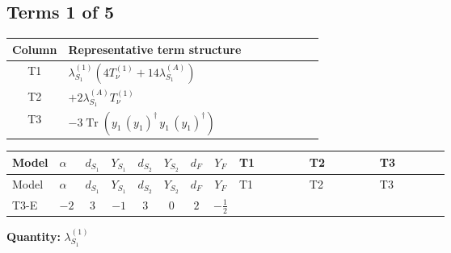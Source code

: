 \documentclass[8pt]{article}
\begin{document}
\begin{landscape}
\subsection*{Terms 1 of 5}
\begin{center}
\begin{tabular}{@{}c >{\raggedright\arraybackslash}p{0.82\linewidth}@{}}
\toprule
Column & Representative term structure \\
\midrule
T1 & \(\displaystyle {\lambda_{S_1}^{(1)}} (4 T_{\nu}^{(1)}+14 {\lambda_{S_1}^{(A)}})\) \\
\midrule
T2 & \(\displaystyle +2 {\lambda_{S_1}^{(A)}} T_{\nu}^{(1)}\) \\
\midrule
T3 & \(\displaystyle -3 \operatorname{Tr}\!\left({y_1}\,\left({y_1}\right)^{\dagger}\,{y_1}\,\left({y_1}\right)^{\dagger}\right)\) \\
\midrule
\bottomrule
\end{tabular}
\end{center}
\smallskip
\tiny
\begin{longtable}{@{}llcccccc >{\raggedright\arraybackslash}p{0.21\linewidth} >{\raggedright\arraybackslash}p{0.21\linewidth} >{\raggedright\arraybackslash}p{0.21\linewidth}@{}}
\toprule
Model & $\alpha$ & $d_{S_1}$ & $Y_{S_1}$ & $d_{S_2}$ & $Y_{S_2}$ & $d_F$ & $Y_F$ & T1 & T2 & T3 \\
\midrule
\endfirsthead
\toprule
Model & $\alpha$ & $d_{S_1}$ & $Y_{S_1}$ & $d_{S_2}$ & $Y_{S_2}$ & $d_F$ & $Y_F$ & T1 & T2 & T3 \\
\midrule
\endhead
T3-E & $-2$ & $3$ & $-1$ & $3$ & $0$ & $2$ & $-\frac{1}{2}$ & \scriptsize\adjustbox{max width=\linewidth}{$\begin{gathered} {\lambda_{S_1}^{(1)}} (4 T_{\nu}^{(1)}+14 {\lambda_{S_1}^{(A)}})\end{gathered}$} & \scriptsize\adjustbox{max width=\linewidth}{$\begin{gathered} +2 {\lambda_{S_1}^{(A)}} T_{\nu}^{(1)}\end{gathered}$} & \scriptsize\adjustbox{max width=\linewidth}{$\begin{gathered} -3 \operatorname{Tr}\!\left({y_1}\,\left({y_1}\right)^{\dagger}\,{y_1}\,\left({y_1}\right)^{\dagger}\right)\end{gathered}$} \\
\midrule
\bottomrule
\end{longtable}
\clearpage
\noindent\textbf{Quantity: }$\lambda_{S_1}^{(1)}$\par\smallskip

\end{landscape}
\end{document}
